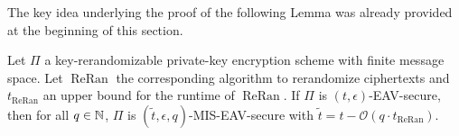 
The key idea underlying the proof of the following Lemma was already provided at the beginning of this section.

\begin{lemma} \label{lemma:mis-eav-from-eav-with-key-rerandomizability}
	Let $\Pi$ a key-rerandomizable private-key encryption scheme with finite message space. Let $\operatorname{ReRan}$ the corresponding algorithm to rerandomize ciphertexts and $t_{\operatorname{ReRan}}$ an upper bound for the runtime of $\operatorname{ReRan}$. If $\Pi$ is $(t, \epsilon)$-EAV-secure, then for all $q \in \mathbb{N}$, $\Pi$ is $(\tilde{t}, \epsilon, q)$-MIS-EAV-secure with $\tilde{t} = t - \mathcal{O}(q \cdot t_{\operatorname{ReRan}})$.
\end{lemma}

